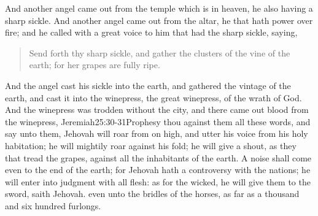 And another angel came out from the temple which is in heaven, he also having a sharp sickle. 
And another angel came out from the altar, he that hath power over fire; and he called with a great voice to him that had the sharp sickle, saying,
\begin{quote}
Send forth thy sharp sickle, and gather the clusters of the vine of the earth; for her grapes are fully ripe.
\end{quote} 
And the angel cast his sickle into the earth, and gathered the vintage of the earth, and cast it into the winepress, the great winepress, of the wrath of God. 
And the winepress was trodden without the city, and there came out blood from the winepress,%
				{Jeremiah}{25:30-31}{Prophesy thou against them all these words, and say unto them, Jehovah will roar from on high, and utter his voice from his holy habitation; he will mightily roar against his fold; he will give a shout, as they that tread the grapes, against all the inhabitants of the earth. A noise shall come even to the end of the earth; for Jehovah hath a controversy with the nations; he will enter into judgment with all flesh: as for the wicked, he will give them to the sword, saith Jehovah.} %
even unto the bridles of the horses, as far as a thousand and six hundred furlongs.
